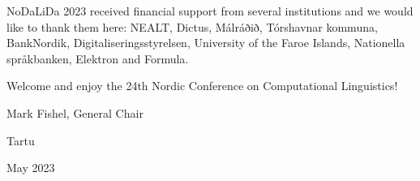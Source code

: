 NoDaLiDa 2023 received financial support from several institutions and we would like to thank them here: NEALT, Dictus, Málráðið, Tórshavnar kommuna, BankNordik, Digitaliseringsstyrelsen, University of the Faroe Islands, Nationella språkbanken, Elektron and Formula.

Welcome and enjoy the 24th Nordic Conference on Computational Linguistics!

Mark Fishel, General Chair

Tartu

May 2023

